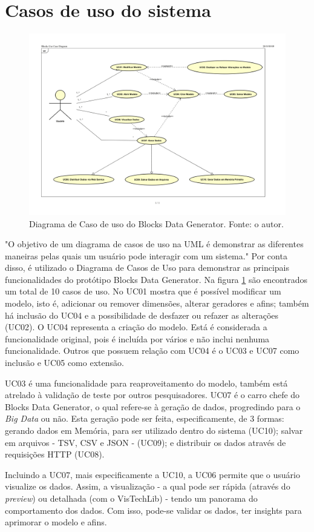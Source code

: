 \documentclass[
	12pt,				%
	openright,			%
	twoside,			%
	a4paper,			%
	english,			%
	brazil				%
	]{abntex2}
\begin{document}
	\section{Casos de uso do sistema}
		\begin{figure}[h!]
			\centering
			\includegraphics[width=\linewidth]{./figures/prototipo/diagramaUC.png}
			\caption{Diagrama de Caso de uso do Blocks Data Generator. Fonte: o autor.}
			\label{fig:diagramaUC}
		\end{figure}
		"O objetivo de um diagrama de casos de uso na UML é demonstrar as diferentes maneiras pelas quais um usuário pode interagir com um sistema." \cite{UCdefinition}
		Por conta disso, é utilizado o Diagrama de Casos de Uso para demonstrar as principais funcionalidades do protótipo Blocks Data Generator.
		Na figura \ref{fig:diagramaUC} são encontrados um total de 10 casos de uso.
		No UC01 mostra que é possível modificar um modelo, isto é, adicionar ou remover dimensões, alterar geradores e afins; também há inclusão do UC04 e a possibilidade de desfazer ou refazer as alterações (UC02).
		O UC04 representa a criação do modelo. 
		Está é considerada a funcionalidade original, pois é incluída por vários e não inclui nenhuma funcionalidade.
		Outros que possuem relação com UC04 é o UC03 e UC07 como inclusão e UC05 como extensão.
		\par
		UC03 é uma funcionalidade para reaproveitamento do modelo, também está atrelado à validação de teste por outros pesquisadores.
		UC07 é o carro chefe do Blocks Data Generator, o qual refere-se à geração de dados, progredindo para o \emph{Big Data} ou não.
		Esta geração pode ser feita, especificamente, de 3 formas: gerando dados em Memória, para ser utilizado dentro do sistema (UC10);
			salvar em arquivos - TSV, CSV e JSON - (UC09);
			e distribuir os dados através de requisições HTTP (UC08).
		\par
		Incluindo a UC07, mais especificamente a UC10, a UC06 permite que o usuário visualize os dados. 
		Assim, a visualização - a qual pode ser rápida (através do \emph{preview}) ou detalhada (com o VisTechLib) - tendo um panorama do comportamento dos dados. 
		Com isso, pode-se validar os dados, ter insights para aprimorar o modelo e afins.
\end{document}
